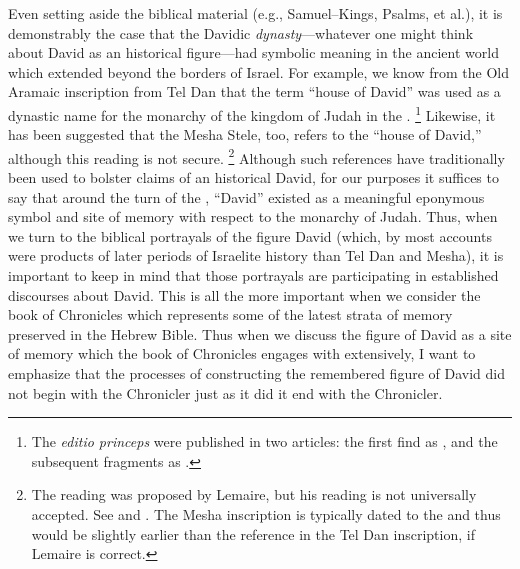Even setting aside the biblical material (e.g., Samuel--Kings, Psalms, et al.), it is demonstrably the case that the Davidic \emph{dynasty}---whatever one might think about David as an historical figure---had symbolic meaning in the ancient world which extended beyond the borders of Israel. For example, we know from the Old Aramaic inscription from Tel Dan that the term  ``house of David'' was used as a dynastic name for the monarchy of the kingdom of Judah in the .%
    \footnote{The \emph{editio princeps} were published in two articles: the first find as \cite{biran-naveh_iej1993}, and the subsequent fragments as \cite{biran-naveh_iej1995}.}
Likewise, it has been suggested that the Mesha Stele, too, refers to the ``house of David,'' although this reading is not secure.%
    \footnote{The reading  was proposed by Lemaire, but his reading is not universally accepted. See \cite{lemaire_sel1994} and \cite{lemaire_bar1994}. The Mesha inscription is typically dated to the  and thus would be slightly earlier than the reference in the Tel Dan inscription, if Lemaire is correct.}
Although such references have traditionally been used to bolster claims of an historical David, for our purposes it suffices to say that around the turn of the , ``David'' existed as a meaningful eponymous symbol and site of memory with respect to the monarchy of Judah. Thus, when we turn to the biblical portrayals of the figure David (which, by most accounts were products of later periods of Israelite history than Tel Dan and Mesha), it is important to keep in mind that those portrayals are participating in established discourses about David. This is all the more important when we consider the book of Chronicles which represents some of the latest strata of memory preserved in the Hebrew Bible. Thus when we discuss the figure of David as a site of memory which the book of Chronicles engages with extensively, I want to emphasize that the processes of constructing the remembered figure of David did not begin with the Chronicler just as it did it end with the Chronicler.\autocite{frohlich_frohlich2019}

